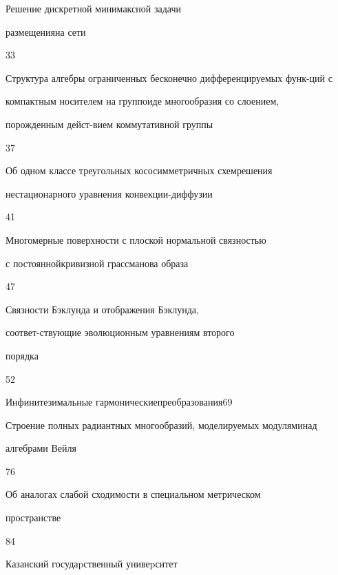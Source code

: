 {Решение дискретной минимаксной задачи


размещения\newline на сети}{33}




{Структура алгебры ограниченных бесконечно дифференцируемых функ-\newline ций с


компактным носителем на группоиде многообразия со слоением,


порожденным дейст-\newline вием коммутативной группы}{37}




{Об одном классе треугольных кососимметричных схем\newline решения


нестационарного уравнения конвекции-диффузии}{41}




{Многомерные поверхности с плоской нормальной связностью


с постоянной\newline кривизной грассманова образа}{47}




{Связности Бэклунда и отображения Бэклунда,


соответ-\newline ствующие эволюционным уравнениям второго


порядка}{52}




{Инфинитезимальные гармонические\newline преобразования}{69}




{Строение полных радиантных многообразий, моделируемых модулями\newline над


алгебрами Вейля}{76}




{Об аналогах слабой сходимости в специальном метрическом


пространстве}{84}
















\vfill


\noindent\raisebox{2pt}{\copyright} Казанский госудаpственный унивеpситет





